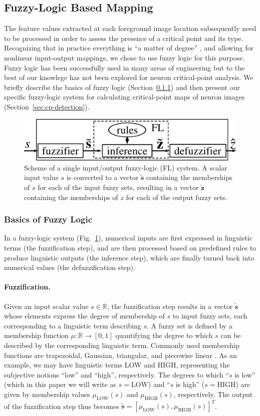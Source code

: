 \subsection{Fuzzy-Logic Based Mapping}
\label{subsec:flrb-detection}
The feature values extracted at each foreground image location subsequently need to be processed in order to assess the presence of a critical point and its type. Recognizing that in practice everything is ``a matter of degree'' \cite{zadeh1975fuzzy}, and allowing for nonlinear input-output mappings, we chose to use fuzzy logic for this purpose. Fuzzy logic has been successfully used in many areas of engineering \cite{mendel1995fuzzy} but to the best of our knowlege has not been explored for neuron critical-point analysis. We briefly describe the basics of fuzzy logic (Section~\ref{sec:FL}) and then present our specific fuzzy-logic system for calculating critical-point maps of neuron images (Section~\ref{sec:cp-detection}).
\begin{figure}
	\centering
	\includegraphics[width=0.5\columnwidth]{fig5}
	\caption{Scheme of a single input/output fuzzy-logic (FL) system. A scalar input value $s$ is converted to a vector $\tilde{\mathbf{s}}$ containing the memberships of $s$ for each of the input fuzzy sets, resulting in a vector $\tilde{\mathbf{z}}$ containing the memberships of $z$ for each of the output fuzzy sets.}
	\label{fig5}
\end{figure}
\subsubsection{Basics of Fuzzy Logic}
\label{sec:FL}
In a fuzzy-logic system (Fig.~\ref{fig5}), numerical inputs are first expressed in linguistic terms (the fuzzification step), and are then processed based on predefined rules to produce linguistic outputs (the inference step), which are finally turned back into numerical values (the defuzzification step).
\paragraph{Fuzzification.} Given an input scalar value $s\in\mathbb{R}$, the fuzzification step results in a vector $\tilde{\mathbf{s}}$ whose elements express the degree of membership of $s$  to input fuzzy sets, each corresponding to a linguistic term describing $s$. A fuzzy set is defined by a membership function $\mu:\mathbb{R}\rightarrow[0,1]$ quantifying the degree to which $s$ can be described by the corresponding linguistic term. Commonly used membership functions are trapezoidal, Gaussian, triangular, and piecewise linear \cite{mendel1995fuzzy}. As an example, we may have linguistic terms LOW and HIGH, representing the subjective notions ``low'' and ``high'', respectively. The degrees to which ``$s$ is low'' (which in this paper we will write as $s=\textrm{LOW}$) and ``$s$ is high'' ($s=\textrm{HIGH}$) are given by membership values $\mu_{\textrm{LOW}}(s)$ and $\mu_{\textrm{HIGH}}(s)$, respectively. The output of the fuzzification step thus becomes $\tilde{\mathbf{s}}=[\mu_{\textrm{LOW}}(s),\mu_{\textrm{HIGH}}(s)]^{T}$.
